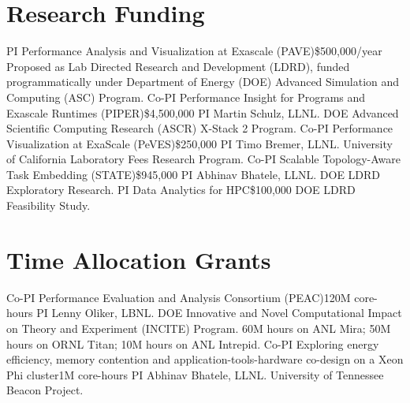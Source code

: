 \section{Research Funding}
		{PI}
		{Performance Analysis and Visualization at Exascale (PAVE)}{}{\$500,000/year}
		{Proposed as Lab Directed Research and Development (LDRD), funded
		 programmatically under\newline
		 Department of Energy (DOE) Advanced Simulation and Computing (ASC) Program.}
		{Co-PI}
		{Performance Insight for Programs and Exascale Runtimes (PIPER)}{}{\$4,500,000}
		{PI Martin Schulz, LLNL. DOE Advanced Scientific Computing Research (ASCR)
		 X-Stack 2 Program.}
		{Co-PI}
		{Performance Visualization at ExaScale (PeVES)}{}{\$250,000}
		{PI Timo Bremer, LLNL. University of California Laboratory Fees Research Program.}
		{Co-PI}
		{Scalable Topology-Aware Task Embedding (STATE)}{}{\$945,000}
		{PI Abhinav Bhatele, LLNL. DOE LDRD Exploratory Research.}
		{PI}
		{Data Analytics for HPC}{}{\$100,000}
		{DOE LDRD Feasibility Study.}

\section{Time Allocation Grants}
		{Co-PI}
		{Performance Evaluation and Analysis Consortium (PEAC)}{}{120M core-hours}
		{PI Lenny Oliker, LBNL.  DOE Innovative and Novel Computational Impact on Theory
		 and Experiment (INCITE) Program.  60M hours on ANL Mira; 50M hours on ORNL Titan;
		 10M hours on ANL Intrepid.}
	{Co-PI}
	{Exploring energy efficiency, memory contention and application-tools-hardware
		co-design on a Xeon Phi cluster}{}{1M core-hours}
	{PI Abhinav Bhatele, LLNL.  University of Tennessee Beacon Project.}
